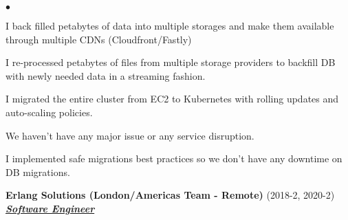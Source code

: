 \documentclass[a4paper]{article}
\newcommand{\employer}[3]{{
  \textbf{#1} (#2)\\ \underline{\textbf{\emph{#3}}}\\ }}
\newenvironment{achievements}{\begin{list}{$\bullet$}{\topsep 0pt \itemsep
  -2pt}}{\vspace*{4pt}\end{list}}
\begin{document}
\begin{achievements}
  \item I back filled petabytes of data into multiple storages and make them available through multiple CDNs (Cloudfront/Fastly)
  \item I re-processed petabytes of files from multiple storage providers to backfill DB with newly needed data in a streaming fashion.
  \item I migrated the entire cluster from EC2 to Kubernetes with rolling updates and auto-scaling policies.
  \item We haven't have any major issue or any service disruption.
  \item I implemented safe migrations best practices so we don't have any downtime on DB migrations.
  \end{achievements}

  \employer{ Erlang Solutions (London/Americas Team - Remote)}{2018-2, 2020-2}{Software Engineer}
\end{document}
